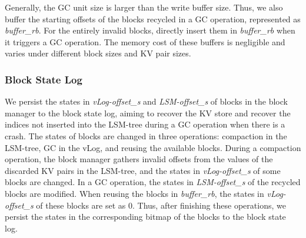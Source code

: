 \documentclass[sigconf]{acmart}
\begin{document}
Generally, the GC unit size is larger than the write buffer size. Thus, we also buffer the starting offsets of the blocks recycled in a GC operation, represented as \textit{buffer\_rb}. For the entirely invalid blocks, directly insert them in \textit{buffer\_rb} when it triggers a GC operation. The memory cost of these buffers is negligible and varies under different block sizes and KV pair sizes. 

\subsubsection{Block State Log} 
We persist the states in \textit{vLog-offset\_s} and \textit{LSM-offset\_s} of blocks in the block manager to the block state log, aiming to recover the KV store and recover the indices not inserted into the LSM-tree during a GC operation when there is a crash. The states of blocks are changed in three operations: compaction in the LSM-tree, GC in the vLog, and reusing the available blocks. During a compaction operation, the block manager gathers invalid offsets from the values of the discarded KV pairs in the LSM-tree, and the states in \textit{vLog-offset\_s} of some blocks are changed. In a GC operation, the states in \textit{LSM-offset\_s} of the recycled blocks are modified. When reusing the blocks in \textit{buffer\_rb}, the states in \textit{vLog-offset\_s} of these blocks are set as 0. Thus, after finishing these operations, we persist the states in the corresponding bitmap of the blocks to the block state log.  

\end{document}
